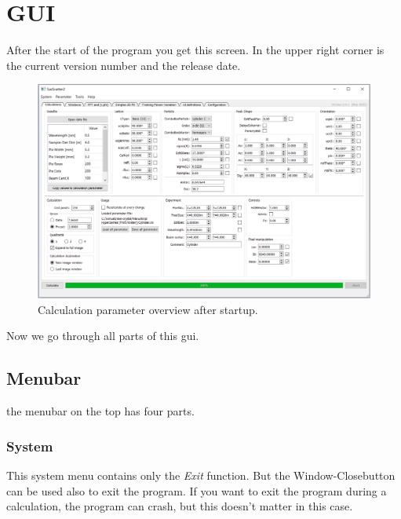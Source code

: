 \documentclass[11pt]{article} %
\begin{document}
\section{GUI}

After the start of the program you get this screen. In the upper right corner is the current version number and the release date.

\begin{figure}[H]
 \centering
 \includegraphics[width=\textwidth]{gui-calculations.png}
 \caption{Calculation parameter overview after startup.}
\end{figure}
Now we go through all parts of this gui.


\subsection{Menubar}

the menubar on the top has four parts.

\subsubsection{System}

This system menu contains only the {\it Exit} function. But the Window-Closebutton can be used also to exit the program. If you want to exit the program during a calculation, the program can crash, but this doesn't matter in this case.
\end{document}
